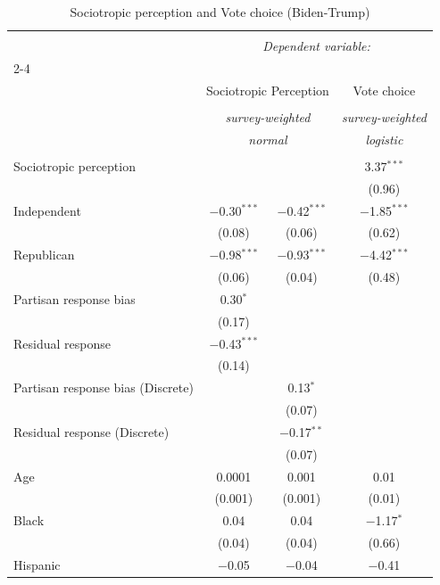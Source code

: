 \documentclass{article}\usepackage[]{graphicx}\usepackage[]{xcolor}
\begin{document}
\begin{table}[H]
\centering
\caption{Sociotropic perception and Vote choice (Biden-Trump)}

\begingroup 
\small 
\begin{tabular}{@{\extracolsep{5pt}}lccc} 
\\[-1.8ex]\hline 
\hline \\[-1.8ex] 
 & \multicolumn{3}{c}{\textit{Dependent variable:}} \\ 
\cline{2-4} 
\\[-1.8ex] & \multicolumn{2}{c}{Sociotropic Perception} & Vote choice \\ 
\\[-1.8ex] & \multicolumn{2}{c}{\textit{survey-weighted}} & \textit{survey-weighted} \\ 
 & \multicolumn{2}{c}{\textit{normal}} & \textit{logistic} \\ 
\hline \\[-1.8ex] 
 Sociotropic perception &  &  & 3.37$^{***}$ \\ 
  &  &  & (0.96) \\ 
  Independent & $-$0.30$^{***}$ & $-$0.42$^{***}$ & $-$1.85$^{***}$ \\ 
  & (0.08) & (0.06) & (0.62) \\ 
  Republican & $-$0.98$^{***}$ & $-$0.93$^{***}$ & $-$4.42$^{***}$ \\ 
  & (0.06) & (0.04) & (0.48) \\ 
  Partisan response bias & 0.30$^{*}$ &  &  \\ 
  & (0.17) &  &  \\ 
  Residual response & $-$0.43$^{***}$ &  &  \\ 
  & (0.14) &  &  \\ 
  Partisan response bias (Discrete) &  & 0.13$^{*}$ &  \\ 
  &  & (0.07) &  \\ 
  Residual response (Discrete) &  & $-$0.17$^{**}$ &  \\ 
  &  & (0.07) &  \\ 
  Age & 0.0001 & 0.001 & 0.01 \\ 
  & (0.001) & (0.001) & (0.01) \\ 
  Black & 0.04 & 0.04 & $-$1.17$^{*}$ \\ 
  & (0.04) & (0.04) & (0.66) \\ 
  Hispanic & $-$0.05 & $-$0.04 & $-$0.41 \\ 

\end{tabular}
\end{table}
\end{document}
